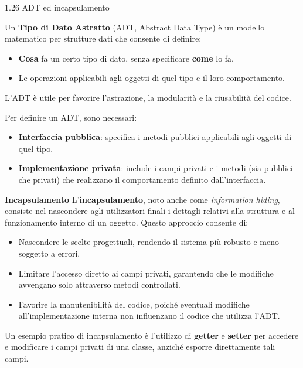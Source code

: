 \begin{problem}{1.26}
	ADT ed incapsulamento
	\end{problem}
	\begin{solution}
	Un \textbf{Tipo di Dato Astratto} (ADT, Abstract Data Type) è un modello matematico per strutture dati che consente di definire:
	\begin{itemize}
		\item \textbf{Cosa} fa un certo tipo di dato, senza specificare \textbf{come} lo fa.
		\item Le operazioni applicabili agli oggetti di quel tipo e il loro comportamento.
	\end{itemize}
	L'ADT è utile per favorire l'astrazione, la modularità e la riusabilità del codice.
	
	Per definire un ADT, sono necessari:
	\begin{itemize}
		\item \textbf{Interfaccia pubblica}: specifica i metodi pubblici applicabili agli oggetti di quel tipo.
		\item \textbf{Implementazione privata}: include i campi privati e i metodi (sia pubblici che privati) che realizzano il comportamento definito dall'interfaccia.
	\end{itemize}
	
	\textbf{Incapsulamento}
	L'\textbf{incapsulamento}, noto anche come \textit{information hiding}, consiste nel nascondere agli utilizzatori finali i dettagli relativi alla struttura e al funzionamento interno di un oggetto. Questo approccio consente di:
	\begin{itemize}
		\item Nascondere le scelte progettuali, rendendo il sistema più robusto e meno soggetto a errori.
		\item Limitare l'accesso diretto ai campi privati, garantendo che le modifiche avvengano solo attraverso metodi controllati.
		\item Favorire la manutenibilità del codice, poiché eventuali modifiche all'implementazione interna non influenzano il codice che utilizza l'ADT.
	\end{itemize}
	
	Un esempio pratico di incapsulamento è l'utilizzo di \textbf{getter} e \textbf{setter} per accedere e modificare i campi privati di una classe, anziché esporre direttamente tali campi.
\end{solution}


